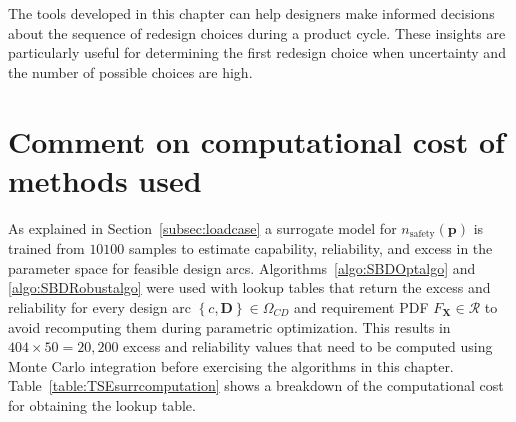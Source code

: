 The tools developed in this chapter can help designers make informed decisions about the sequence of redesign choices during a product cycle. These insights are particularly useful for determining the first redesign choice when uncertainty  and the number of possible choices are high.

{\color{red}
\section{Comment on computational cost of methods used}
\label{sec:comptcostSBD}

As explained in Section~\ref{subsec:loadcase} a surrogate model for $n_{\textrm{safety}}(\mathbf{p})$ is trained from $10100$ samples to estimate capability, reliability, and excess in the parameter space for feasible design arcs. Algorithms~\ref{algo:SBDOptalgo} and \ref{algo:SBDRobustalgo} were used with lookup tables that return the excess and reliability for every design arc $\left\{c,\mathbf{D}\right\} \in \Omega_{CD}$ and requirement \ac{PDF} $F_{\mathbf{X}} \in \mathcal{R}$ to avoid recomputing them during parametric optimization. This results in $404 \times 50 = 20,200$ excess and reliability values that need to be computed using Monte Carlo integration before exercising the algorithms in this chapter. Table~\ref{table:TSEsurrcomputation} shows a breakdown of the computational cost for obtaining the lookup table.
}

